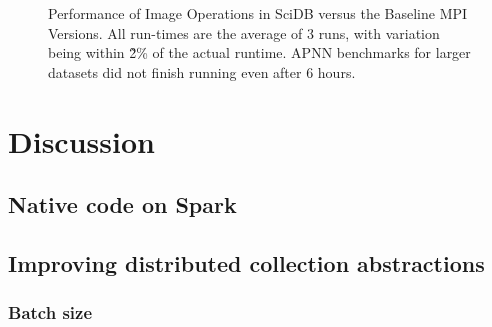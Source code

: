 \documentclass[tog]{acmsiggraph}
\begin{document}
\begin{figure}[htp]
\centering
	 \hspace{1 em}
	\caption{Performance of Image Operations in SciDB versus the Baseline MPI Versions. All run-times are the average of 3 runs, with variation being within \~2\% of the actual runtime. APNN benchmarks for larger datasets did not finish running even after 6 hours.}
	\label{fig:breakdown}
\end{figure}

\section{Discussion}

\subsection{Native code on Spark}

\subsection{Improving distributed collection abstractions}

\subsubsection{Batch size}
\end{document}
